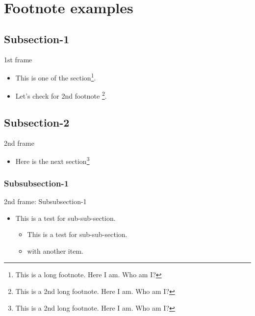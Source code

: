 \section{Footnote examples}
\subsection{Subsection-1}
\begin{frame}[fragile]{1st frame}
    \begin{itemize}
        \item This is one of the section\footnote{This is a long footnote. Here I am. Who am I?}. 
        \item Let's check for 2nd footnote \footnote{This is a 2nd long footnote. Here I am. Who am I?}.
    \end{itemize}
\end{frame}
\subsection{Subsection-2}
\begin{frame}[fragile]{2nd frame}
   \begin{itemize}
      \item Here is the next section\footnote{This is a 2nd long footnote. Here I am. Who am I?}
   \end{itemize}
\end{frame}
\subsubsection{Subsubsection-1}
\begin{frame}{2nd frame: Subsubsection-1}
\begin{itemize}
    \item This is a test for sub-sub-section.
    \begin{itemize}
        \item This is a test for sub-sub-section.
        \item with another item.
    \end{itemize}
\end{itemize}
\end{frame}
